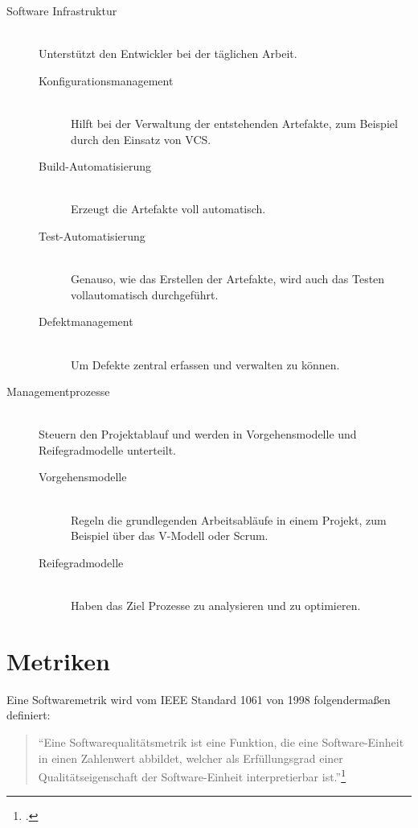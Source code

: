 \begin{description}
  \item[Software Infrastruktur] \hfill \\ Unterstützt den Entwickler bei der täglichen Arbeit.
  \begin{description}
    \item[Konfigurationsmanagement] \hfill \\ Hilft bei der Verwaltung der entstehenden Artefakte, zum Beispiel durch den Einsatz von \ac{VCS}.
    \item[Build-Automatisierung] \hfill \\ Erzeugt die Artefakte voll automatisch.
    \item[Test-Automatisierung] \hfill \\ Genauso, wie das Erstellen der Artefakte, wird auch das Testen vollautomatisch durchgeführt.
    \item[Defektmanagement] \hfill \\ Um Defekte zentral erfassen und verwalten zu können.
  \end{description}
  \item[Managementprozesse] \hfill \\ Steuern den Projektablauf und werden in Vorgehensmodelle und Reifegradmodelle unterteilt.
  \begin{description}
    \item[Vorgehensmodelle] \hfill \\ Regeln die grundlegenden Arbeitsabläufe in einem Projekt, zum Beispiel über das V-Modell oder Scrum.
    \item[Reifegradmodelle] \hfill \\ Haben das Ziel Prozesse zu analysieren und zu optimieren.
  \end{description}
\end{description}

\clearpage
\section{Metriken}

Eine Softwaremetrik wird vom \ac{IEEE} Standard 1061 von 1998 folgendermaßen definiert:
\begin{quote}
  ``Eine Softwarequalitätsmetrik ist eine Funktion, die eine Software-Einheit in einen Zahlenwert abbildet, welcher als Erfüllungsgrad einer Qualitätseigenschaft der Software-Einheit interpretierbar ist.''\footcite[vgl.][S.3]{ieee-1061}
\end{quote}


